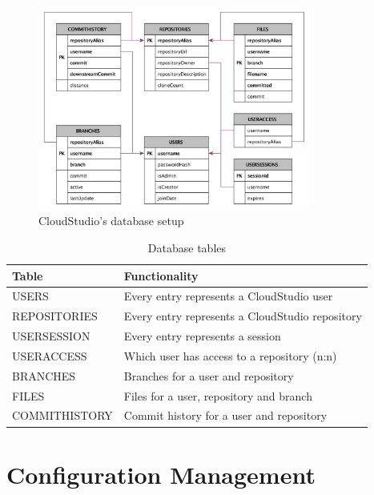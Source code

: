\begin{figure}[h!]
  \centering
      \includegraphics[width=0.8\textwidth]{databasegraph}
  \caption{CloudStudio's database setup}
  \label{fig:databasegraph}
\end{figure}



\begin{table}

    \scriptsize
    \begin{tabularx}{\textwidth}{ | l | X | }
    \hline
\textbf{Table} & \textbf{Functionality} \\ \hline
USERS & Every entry represents a CloudStudio user \\ \hline
REPOSITORIES & Every entry represents a CloudStudio repository \\ \hline
USERSESSION & Every entry represents a session \\ \hline
USERACCESS & Which user has access to a repository (n:n) \\ \hline
BRANCHES & Branches for a user and repository \\ \hline
FILES & Files for a user, repository and branch \\ \hline
COMMITHISTORY & Commit history for a user and repository \\ \hline
    \end{tabularx}
    
    \centering
  \caption{Database tables}
  \label{table:databasetables}
\end{table}



\section{Configuration Management}\label{configmanagement}

